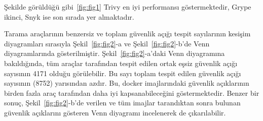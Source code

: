 Şekilde görüldüğü gibi~\ref{fig:fig1} Trivy en iyi performansı göstermektedir, Grype ikinci, Snyk ise son sırada yer almaktadır.

Tarama araçlarının benzersiz ve toplam güvenlik açığı tespit sayılarının kesişim diyagramları sırasıyla Şekil~\ref{fig:fig2}-a ve Şekil~\ref{fig:fig2}-b'de Venn diyagramlarında gösterilmiştir. Şekil~\ref{fig:fig2}-a'daki Venn diyagramına bakıldığında, tüm araçlar tarafından tespit edilen ortak eşsiz güvenlik açığı sayısının 4171 olduğu görülebilir. Bu sayı toplam tespit edilen güvenlik açığı sayısının (8752) yarısından azdır. Bu, docker imajlarındaki güvenlik açıklarının birden fazla araç tarafından daha iyi kapsanabileceğini göstermektedir. Benzer bir sonuç, Şekil~\ref{fig:fig2}-b'de verilen ve tüm imajlar tarandıktan sonra bulunan güvenlik açıklarını gösteren Venn diyagramı incelenerek de çıkarılabilir.


